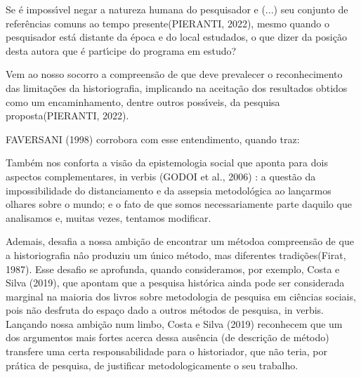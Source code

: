 \documentclass[
12pt,		%
openright,	%
twoside,  %
a4paper,			%
chapter=TITLE,		%
english,			%
french,				%
spanish,			%
brazil				%
]{USPSC-classe/USPSC}
\begin{document}
Se \'e imposs\'{\i}vel \textquotedbl negar a natureza humana do pesquisador e (...) seu conjunto de refer\^encias comuns ao tempo presente\textquotedbl  (PIERANTI, 2022), mesmo quando o pesquisador est\'a \textquotedbl distante da \'epoca e do local estudados\textquotedbl , o que dizer da posi\c{c}\~ao desta autora que \'e part\'{\i}cipe do programa em estudo?




Vem ao nosso socorro a compreens\~ao de que \textquotedbl deve prevalecer o reconhecimento das limita\c{c}\~oes da historiografia, implicando na aceita\c{c}\~ao dos resultados obtidos como um encaminhamento, dentre outros poss\'{\i}veis, da pesquisa proposta\textquotedbl  (PIERANTI, 2022).




 FAVERSANI (1998) corrobora com esse entendimento, quando traz:





\noindent\begin{center}\mbox{\centering{}}\end{center}


Tamb\'em nos conforta a vis\~ao da epistemologia social que aponta para dois aspectos complementares, in verbis  (GODOI et al., 2006) : \textquotedbl a quest\~ao da impossibilidade do distanciamento e da assepsia metodol\'ogica ao lan\c{c}armos olhares sobre o mundo; e o fato de que somos necessariamente parte daquilo que analisamos e, muitas vezes, tentamos modificar\textquotedbl .




Ademais, desafia a nossa ambi\c{c}\~ao de \textquotedbl encontrar um m\'etodo\textquotedbl  a compreens\~ao de que a \textquotedbl historiografia n\^ao produziu um \'unico m\'etodo, mas diferentes tradi\c{c}\~oes\textquotedbl   (Firat, 1987).  Esse desafio se aprofunda, quando consideramos, por exemplo, Costa e Silva (2019), que apontam que a \textquotedbl pesquisa hist\'orica ainda pode ser considerada marginal na maioria dos livros sobre metodologia de pesquisa em ci\^encias sociais, pois n\~ao desfruta do espa\c{c}o dado a outros m\'etodos de pesquisa\textquotedbl , in verbis. Lan\c{c}ando nossa ambi\c{c}\~ao num limbo,  Costa e Silva (2019) reconhecem \textquotedbl que um dos argumentos mais fortes acerca dessa aus\^encia (de descri\c{c}\~ao de m\'etodo) transfere uma certa responsabilidade para o historiador, que n\~ao teria, por pr\'atica de pesquisa, de justificar metodologicamente o seu trabalho\textquotedbl .
\end{document}
